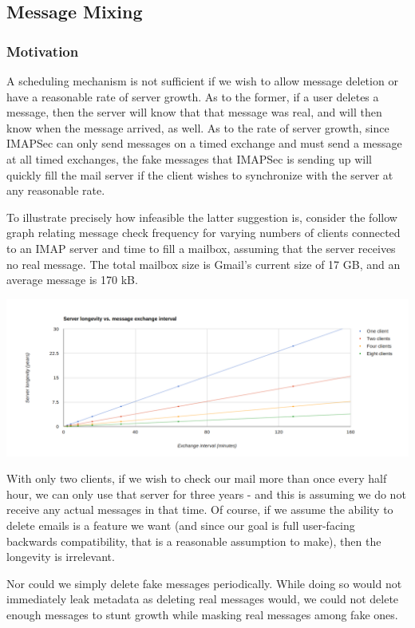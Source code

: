 \documentclass[pageno]{jpaper}
\newcommand{\project}{IMAPSec }
\begin{document}
\label{mixing}
\subsection{Message Mixing}

\subsubsection{Motivation}
A scheduling mechanism is not sufficient if we wish to allow message deletion or have a reasonable rate of server growth. As to the former, if a user deletes a message, then the server will know that that message was real, and will then know when the message arrived, as well. As to the rate of server growth, since \project can only send messages on a timed exchange and must send a message at all timed exchanges, the fake messages that \project is sending up will quickly fill the mail server if the client wishes to synchronize with the server at any reasonable rate.

To illustrate precisely how infeasible the latter suggestion is, consider the follow graph relating message check frequency for varying numbers of clients connected to an IMAP server and time to fill a mailbox, assuming that the server receives no real message. The total mailbox size is Gmail's current size of 17 GB, and an average message is 170 kB.

\includegraphics[width=\textwidth]{server_longevity}

With only two clients, if we wish to check our mail more than once every half hour, we can only use that server for three years - and this is assuming we do not receive any actual messages in that time. Of course, if we assume the ability to delete emails is a feature we want (and since our goal is full user-facing backwards compatibility, that is a reasonable assumption to make), then the longevity is irrelevant.

Nor could we simply delete fake messages periodically. While doing so would not immediately leak metadata as deleting real messages would, we could not delete enough messages to stunt growth while masking real messages among fake ones.
\end{document}
